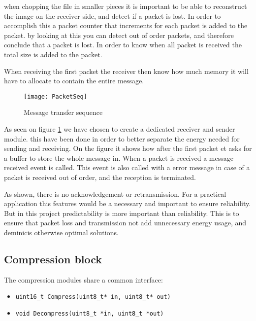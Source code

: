 when chopping the file in smaller pieces it is important to be able to reconstruct the image on the receiver side, and detect if a packet is lost. In order to accomplish this a packet counter that increments for each packet is added to the packet. by looking at this you can detect out of order packets, and therefore conclude that a packet is lost. In order to know when all packet is received the total size is added to the packet.  

When receiving the first packet the receiver then know how much memory it will have to allocate to contain the entire message. 


\begin{figure}[H]
	\centering
	\texttt{[image: PacketSeq]}
	\caption{Message transfer sequence }
	\label{fig:PacketSeq}
\end{figure}

As seen on figure \ref{fig:PacketSeq} we have chosen to create a dedicated receiver and sender module. this have been done in order to better separate the energy needed for sending and receiving. On the figure it shows how after the first packet et asks for a buffer to store the whole message in. When a packet is received a message received event is called. This event is also called with a error message in case of a packet is received out of order, and the reception is terminated. 

As shown, there is no acknowledgement or retransmission. For a practical application this features would be a necessary and important to ensure reliability. But in this project predictability is more important than reliability.  This is to ensure that packet loss and transmission not add unnecessary energy usage, and deminicis otherwise optimal solutions.  





\subsection{Compression block}
\label{sec:Compression-block}

The compression modules share a common interface: 

\begin{itemize}
    \item \texttt{uint16\_t Compress(uint8\_t* in, uint8\_t* out)}
    \item \texttt{void Decompress(uint8\_t *in, uint8\_t *out)}
\end{itemize}


